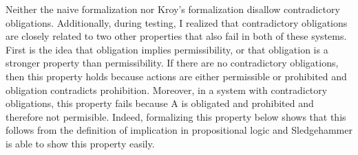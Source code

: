 \begin{isabellebody}
\begin{isamarkuptext}
Neither the naive formalization nor Kroy's formalization disallow contradictory obligations. Additionally,
during testing, I realized that contradictory obligations are closely related to two other properties
that also fail in both of these systems. First is the idea that obligation implies permissibility, or 
that obligation is a stronger property than permissibility. If there are no contradictory obligations, 
then this property holds because actions are either permissible or prohibited and obligation contradicts
prohibition. Moreover, in a system with contradictory obligations, this property fails because A is
obligated and prohibited and therefore not permisible. Indeed, formalizing this property below shows 
that this follows from the definition of implication in propositional logic and Sledgehammer is able
to show this property easily.


\end{isamarkuptext}
\end{isabellebody}
